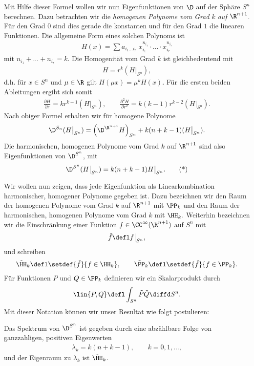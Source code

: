 \documentclass[%
	paper=a5,%
	fleqn,%
	DIV=18,%
	BCOR=0mm,
	fontsize=11pt,
	titlepage=false,%
	bibliography=totoc,
	DIV=18,%
	twoside=true,
	pdftitle=Riemannsche Geometrie,
	pdfauthor=Uwe Semmelmann,
	numbers=noendperiod]%
	{scrbook}
\begin{document}
Mit Hilfe dieser Formel wollen wir nun Eigenfunktionen von $\D$ auf der Sphäre $S^n$ berechnen. Dazu betrachten wir die \textit{homogenen Polynome vom Grad $k$ auf $\R^{n+1}$}. Für den Grad $0$ sind dies gerade die konstanten und für den Grad $1$ die linearen Funktionen. Die allgemeine Form eines solchen Polynoms ist
\begin{align*}
H(x) = \sum a_{i_{1}\ldots i_{r}} \; x_{i_{1}}^{n_{i_{1}}} \cdot \ldots \cdot x_{i_{r}}^{n_{i_{r}}}
\end{align*}
mit $n_{i_{1}}+\ldots+n_{i_{r}}=k$. Die Homogenität vom Grad $k$ ist gleichbedeutend mit
\begin{align*}
H = r^k (H\big|_{S^n}),
\end{align*}
d.h. für $x\in S^n$ und $\mu\in\R$ gilt $H(\mu x) = \mu^k H(x)$. Für die ersten beiden Ableitungen ergibt sich somit
\begin{align*}
\frac{\partial H}{\partial r} = kr^{k-1} (H\big|_{S^n}),\qquad
\frac{\partial^2 H}{\partial r^2} = k(k-1)r^{k-2} (H\big|_{S^n}).
\end{align*}
Nach obiger Formel erhalten wir für homogene Polynome
\begin{align*}
\D^{S_{n}}(H\big|_{S^n}) = 
\left(\D^{\R^{n+1}} H\right)_{S^n} + 
k(n+k-1) (H\big|_{S^n}).
\end{align*}
Die harmonischen, homogenen Polynome vom Grad $k$ auf $\R^{n+1}$ sind also Eigenfunktionen von $\D^{S^n}$, mit
\begin{align*}
\D^{S^n}(H\big|_{S^n}) = k(n+k-1) H\big|_{S^n}.\tag{*}
\end{align*}

Wir wollen nun zeigen, dass jede Eigenfunktion als Linearkombination harmonischer, homogener Polynome gegeben ist. Dazu bezeichnen wir den Raum der homogenen Polynome vom Grad $k$ auf $\R^{n+1}$ mit $\PP_{k}$ und den Raum der harmonischen, homogenen Polynome vom Grad $k$ mit $\HH_{k}$. Weiterhin bezeichnen wir die Einschränkung einer Funktion $f\in\CC ^\infty(\R^{n+1})$ auf $S^n$ mit
\begin{align*}
\tilde{f} \defl f\big|_{S^n},
\end{align*}
und schreiben
\begin{align*}
\tilde\HH_{k} \defl \setdef{\tilde{f}}{f\in\HH_{k}},\qquad \tilde\PP_{k} \defl \setdef{\tilde{f}}{f\in\PP_{k}}.
\end{align*}
Für Funktionen $P$ und $Q\in\PP_{k}$ definieren wir ein Skalarprodukt durch
\begin{align*}
\lin{P,Q} \defl \int_{S^n} \tilde P \tilde Q\diffd S^n.
\end{align*}
Mit dieser Notation können wir unser Resultat wie folgt postulieren:
\begin{prop}
Das Spektrum von $\D^{S^n}$ ist gegeben durch eine abzählbare Folge von ganzzahligen, positiven Eigenwerten
\begin{align*}
\lambda_{k} = k(n+k-1),\qquad k=0,1,\ldots,
\end{align*}
und der Eigenraum zu $\lambda_{k}$ ist $\tilde\HH_{k}$.\fish
\end{prop}
\end{document}
